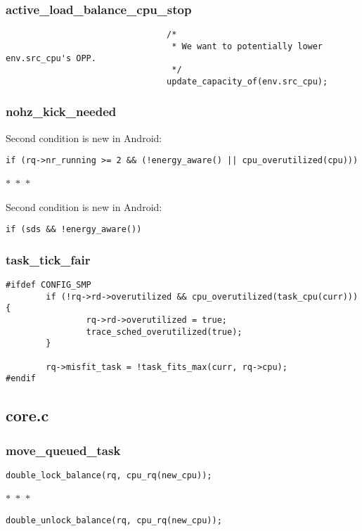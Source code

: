 \documentclass{article}
\newcommand{\divider}{{\begin{center}
  $\ast$~$\ast$~$\ast$
\end{center}}}
\begin{document}
\subsubsection{active\_load\_balance\_cpu\_stop}

\begin{verbatim}
                                /*
                                 * We want to potentially lower env.src_cpu's OPP.
                                 */
                                update_capacity_of(env.src_cpu);
\end{verbatim}

\subsubsection{nohz\_kick\_needed}

Second condition is new in Android:
\begin{verbatim}
if (rq->nr_running >= 2 && (!energy_aware() || cpu_overutilized(cpu)))
\end{verbatim}
\divider

Second condition is new in Android:
\begin{verbatim}
if (sds && !energy_aware())
\end{verbatim}

\subsubsection{task\_tick\_fair}

\begin{verbatim}
#ifdef CONFIG_SMP
        if (!rq->rd->overutilized && cpu_overutilized(task_cpu(curr))) {
                rq->rd->overutilized = true;
                trace_sched_overutilized(true);
        }

        rq->misfit_task = !task_fits_max(curr, rq->cpu);
#endif
\end{verbatim}

\subsection{core.c}

\subsubsection{move\_queued\_task}

\begin{verbatim}
double_lock_balance(rq, cpu_rq(new_cpu));
\end{verbatim}
\divider
\begin{verbatim}
double_unlock_balance(rq, cpu_rq(new_cpu));
\end{verbatim}
\end{document}
